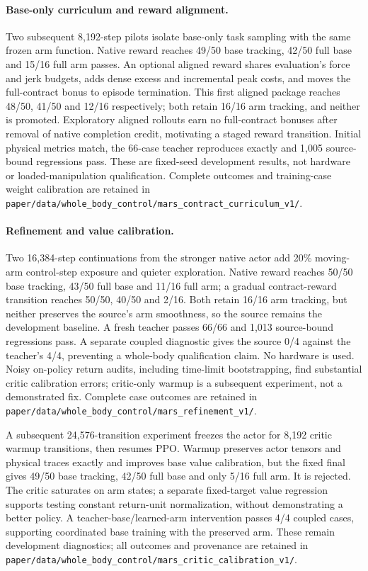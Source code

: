 \paragraph{Base-only curriculum and reward alignment.}
Two subsequent 8,192-step pilots isolate base-only task sampling with the same
frozen arm function. Native reward reaches 49/50 base tracking, 42/50 full base
and 15/16 full arm passes. An optional aligned reward shares evaluation's force
and jerk budgets, adds dense excess and incremental peak costs, and moves the
full-contract bonus to episode termination. This first aligned package reaches
48/50, 41/50 and 12/16 respectively; both retain 16/16 arm tracking, and neither
is promoted. Exploratory aligned rollouts earn no full-contract bonuses after
removal of native completion credit, motivating a staged reward transition.
Initial physical metrics match, the 66-case teacher reproduces exactly and
1,005 source-bound regressions pass. These are fixed-seed development results,
not hardware or loaded-manipulation qualification. Complete outcomes and
training-case weight calibration are retained in
\texttt{paper/data/whole\_body\_control/mars\_contract\_curriculum\_v1/}.

\paragraph{Refinement and value calibration.}
Two 16,384-step continuations from the stronger native actor add 20\% moving-arm
control-step exposure and quieter exploration. Native reward reaches 50/50 base
tracking, 43/50 full base and 11/16 full arm; a gradual contract-reward transition
reaches 50/50, 40/50 and 2/16. Both retain 16/16 arm tracking, but neither preserves
the source's arm smoothness, so the source remains the development baseline.
A fresh teacher passes 66/66 and 1,013 source-bound regressions pass. A separate
coupled diagnostic gives the source 0/4 against the teacher's 4/4, preventing a
whole-body qualification claim. No hardware is used. Noisy on-policy return
audits, including time-limit bootstrapping, find substantial critic calibration
errors; critic-only warmup is a subsequent experiment, not a demonstrated fix.
Complete case outcomes are retained in
\texttt{paper/data/whole\_body\_control/mars\_refinement\_v1/}.

A subsequent 24,576-transition experiment freezes the actor for 8,192 critic
warmup transitions, then resumes PPO. Warmup preserves actor tensors and physical
traces exactly and improves base value calibration, but the fixed final gives
49/50 base tracking, 42/50 full base and only 5/16 full arm. It is rejected.
The critic saturates on arm states; a separate fixed-target value regression
supports testing constant return-unit normalization, without demonstrating a
better policy. A teacher-base/learned-arm intervention passes 4/4 coupled cases,
supporting coordinated base training with the preserved arm. These remain
development diagnostics; all outcomes and provenance are retained in
\texttt{paper/data/whole\_body\_control/mars\_critic\_calibration\_v1/}.

